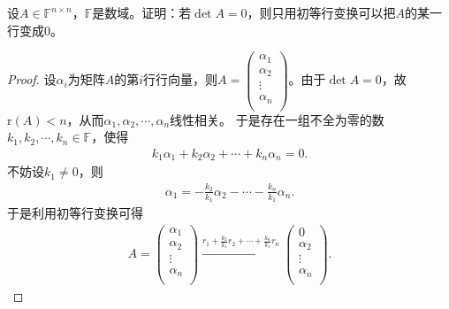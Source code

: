 \documentclass[../../main.tex]{subfiles}%
\begin{document}
\begin{example}
设\(A \in \mathbb{F}^{n\times n}\)，\(\mathbb{F}\)是数域。证明：若\(\det A = 0\)，则只用初等行变换可以把\(A\)的某一行变成\(0\)。
\end{example}
\begin{proof}

设\(\alpha_i\)为矩阵\(A\)的第\(i\)行行向量，则\(A=\left( \begin{array}{c} \alpha_1\\ \alpha_2\\ \vdots\\ \alpha_n\\ \end{array} \right)\)。由于\(\det A=0\)，故\(\text{r}(A) < n\)，从而\(\alpha_1,\alpha_2,\cdots,\alpha_n\)线性相关。
于是存在一组不全为零的数\(k_1,k_2,\cdots,k_n\in \mathbb{F}\)，使得
\begin{align*}
k_1\alpha_1 + k_2\alpha_2 + \cdots + k_n\alpha_n = 0.
\end{align*}
不妨设\(k_1\ne 0\)，则
\begin{align*}
\alpha_1 = -\frac{k_2}{k_1}\alpha_2 - \cdots - \frac{k_n}{k_1}\alpha_n.
\end{align*}
于是利用初等行变换可得
\begin{align*}
A = \left( \begin{array}{c} \alpha_1\\ \alpha_2\\ \vdots\\ \alpha_n\\ \end{array} \right) \xrightarrow{r_1 + \frac{k_2}{k_1}r_2 + \cdots + \frac{k_n}{k_1}r_n} \left( \begin{array}{c} 0\\ \alpha_2\\ \vdots\\ \alpha_n\\ \end{array} \right).
\end{align*}

\end{proof}
\end{document}
